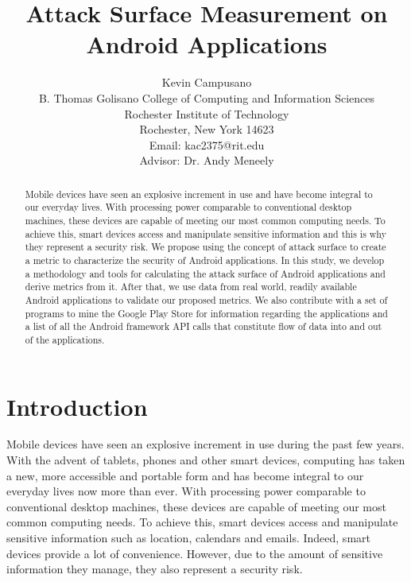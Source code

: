 \documentclass{sig-alternate}
\begin{document}
\title{Attack Surface Measurement on Android Applications}

\author{
  Kevin Campusano\\
  B. Thomas Golisano College of Computing and Information Sciences\\
  Rochester Institute of Technology\\
  Rochester, New York 14623\\
  Email: kac2375@rit.edu\\
  Advisor: Dr. Andy Meneely
}

\maketitle

\begin{abstract}

Mobile devices have seen an explosive increment in use and have become integral to our everyday lives. With processing power comparable to conventional desktop machines, these devices are capable of meeting our most common computing needs. To achieve this, smart devices access and manipulate sensitive information and this is why they represent a security risk. We propose using the concept of attack surface to create a metric to characterize the security of Android applications. In this study, we develop a methodology and tools for calculating the attack surface of Android applications and derive metrics from it. After that, we use data from real world, readily available Android applications to validate our proposed metrics. We also contribute with a set of programs to mine the Google Play Store for information regarding the applications and a list of all the Android framework API calls that constitute flow of data into and out of the applications.

\end{abstract}

\section{Introduction}

Mobile devices have seen an explosive increment in use during the past few years. With the advent of tablets, phones and other smart devices, computing has taken a new, more accessible and portable form and has become integral to our everyday lives now more than ever. With processing power comparable to conventional desktop machines, these devices are capable of meeting our most common computing needs. To achieve this, smart devices access and manipulate sensitive information such as location, calendars and emails. Indeed, smart devices provide a lot of convenience. However, due to the amount of sensitive information they manage, they also represent a security risk.
\end{document}
